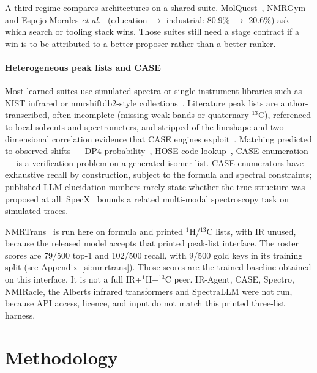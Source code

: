 \documentclass{article}
\begin{document}
A third regime compares architectures on a shared suite.
MolQuest~\citep{han2026molquest}, NMRGym~\citep{fang2026nmrgym} and
Espejo Morales \textit{et al.}~\citep{espejo2026agentic}
(education $\to$ industrial: 80.9\% $\to$ 20.6\%) ask which search or
tooling stack wins.
Those suites still need a stage contract if a win is to be attributed
to a better proposer rather than a better ranker.

\vspace{-0.75cm}
\paragraph{Heterogeneous peak lists and CASE}
Most learned suites use simulated spectra or single-instrument libraries
such as NIST infrared or nmrshiftdb2-style
collections~\citep{nist_webbook,kuhn2015nmrshiftdb2,alberts2025benchmarks}.
Literature peak lists are author-transcribed, often incomplete (missing
weak bands or quaternary $^{13}$C), referenced to local solvents and
spectrometers, and stripped of the lineshape and two-dimensional
correlation evidence that CASE engines
exploit~\citep{elyashberg2012case,buevich2016synergistic}.
Matching predicted to observed shifts --- DP4
probability~\citep{smith2010dp4}, HOSE-code
lookup~\citep{bremser1978hose}, CASE
enumeration~\citep{elyashberg2012case} --- is a verification problem on
a generated isomer list.
CASE enumerators have exhaustive recall by construction, subject to the
formula and spectral constraints; published LLM elucidation numbers
rarely state whether the true structure was proposed at all.
SpecX~\citep{xiang2026specx} bounds a related multi-modal spectroscopy
task on simulated traces.

\label{sec:not-on-roster}
NMRTrans~\citep{yang2026nmrtrans} is run here on formula and printed
$^1$H/$^{13}$C lists, with IR unused, because the released model accepts
that printed peak-list interface.
The roster scores are 79/500 top-1 and 102/500 recall, with 9/500 gold
keys in its training split (see Appendix~\ref{si:nmrtrans}).
Those scores are the trained baseline obtained on this interface.
It is not a full IR+$^1$H+$^{13}$C peer. IR-Agent, CASE, Spectro, NMIRacle, the Alberts infrared transformers and
SpectraLLM were not run, because API access, licence, and input do not
match this printed three-list harness.

\FloatBarrier
\section{Methodology}
\label{sec:benchmark}
\end{document}
